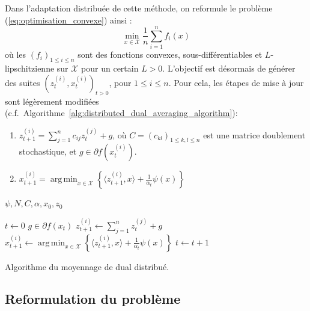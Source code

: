 \documentclass[a4paper]{article}
\DeclareMathOperator*{\argmin}{arg\,min}
\begin{document}
Dans l'adaptation distribuée de cette méthode, on reformule le problème~
(\ref{eq:optimisation_convexe}) ainsi :
\begin{equation}
    \label{eq:optimisation_convexe_distribuee}
    \min_{x \in \mathcal{X}} \frac{1}{n} \sum_{i=1}^n f_i(x)
\end{equation}
où les $(f_i)_{1 \leq i \leq n}$ sont des fonctions convexes,
sous-différentiables et $L$-lipschitzienne sur $\mathcal{X}$ pour un certain
$L > 0$.
L'objectif est désormais de générer des suites $(z_t^{(i)}, x_t^{(i)})_{t > 0}$,
pour $1 \leq i \leq n$. Pour cela, les étapes de mise à jour sont légèrement
modifiées (c.f.\ Algorithme~\ref{alg:distributed_dual_averaging_algorithm}):
\begin{enumerate}
    \item $z_{t + 1}^{(i)} = \sum_{j=1}^n c_{ij} z_t^{(j)} + g$, où
        $C = (c_{kl})_{1 \leq k,l \leq n}$ est une matrice doublement
        stochastique, et $g \in \partial f(x^{(i)}_t)$.
    \item $x^{(i)}_{t+1} =
        \argmin_{x \in \mathcal{X}}
        \left\{ \langle z^{(i)}_{t + 1}, x \rangle + \frac{1}{\alpha_t} \psi(x)\right\}$
\end{enumerate}

\begin{algorithm}[h]
    \begin{algorithmic}
        \Require $\psi, N, C, \mathbb{\alpha}, x_0, z_0$

        \State $t \gets 0$
        \State $g \in \partial f(x_t)$
        \State $z^{(i)}_{t + 1} \gets
        \sum_{j=1}^n z^{(j)}_t + g$
        \State $x^{(i)}_{t + 1} \gets
        \argmin_{x \in \mathcal{X}}
        \left\{ \langle z^{(i)}_{t + 1}, x \rangle + \frac{1}{\alpha_t} \psi(x)\right\}$
        \EndFor
        \State $t \gets t + 1$
        \EndWhile
    \end{algorithmic}
    \caption{Algorithme du moyennage de dual distribué.}
    \label{alg:distributed_dual_averaging_algorithm}
\end{algorithm}

\subsection{Reformulation du problème}
\label{sub:reformulation_du_probleme}
\end{document}
